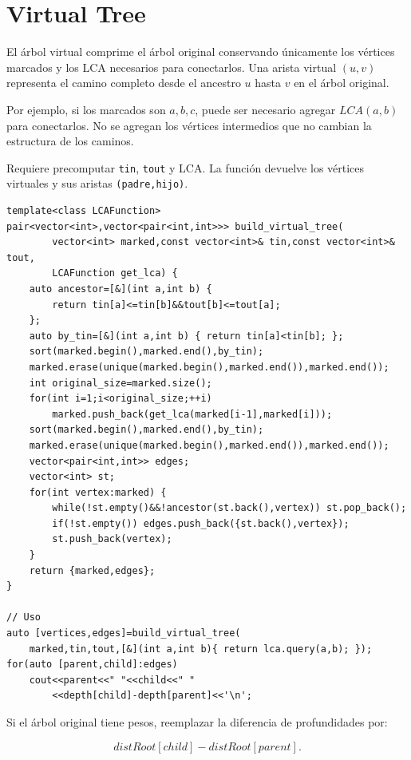\section{Virtual Tree}

El árbol virtual comprime el árbol original conservando únicamente los
vértices marcados y los LCA necesarios para conectarlos. Una arista virtual
$(u,v)$ representa el camino completo desde el ancestro $u$ hasta $v$ en el
árbol original.

Por ejemplo, si los marcados son $a,b,c$, puede ser necesario agregar
$LCA(a,b)$ para conectarlos. No se agregan los vértices intermedios que no
cambian la estructura de los caminos.

Requiere precomputar \texttt{tin}, \texttt{tout} y LCA. La función devuelve
los vértices virtuales y sus aristas \texttt{(padre,hijo)}.


\begin{lstlisting}[style=cpp]
template<class LCAFunction>
pair<vector<int>,vector<pair<int,int>>> build_virtual_tree(
        vector<int> marked,const vector<int>& tin,const vector<int>& tout,
        LCAFunction get_lca) {
    auto ancestor=[&](int a,int b) {
        return tin[a]<=tin[b]&&tout[b]<=tout[a];
    };
    auto by_tin=[&](int a,int b) { return tin[a]<tin[b]; };
    sort(marked.begin(),marked.end(),by_tin);
    marked.erase(unique(marked.begin(),marked.end()),marked.end());
    int original_size=marked.size();
    for(int i=1;i<original_size;++i)
        marked.push_back(get_lca(marked[i-1],marked[i]));
    sort(marked.begin(),marked.end(),by_tin);
    marked.erase(unique(marked.begin(),marked.end()),marked.end());
    vector<pair<int,int>> edges;
    vector<int> st;
    for(int vertex:marked) {
        while(!st.empty()&&!ancestor(st.back(),vertex)) st.pop_back();
        if(!st.empty()) edges.push_back({st.back(),vertex});
        st.push_back(vertex);
    }
    return {marked,edges};
}

// Uso
auto [vertices,edges]=build_virtual_tree(
    marked,tin,tout,[&](int a,int b){ return lca.query(a,b); });
for(auto [parent,child]:edges)
    cout<<parent<<" "<<child<<" "
        <<depth[child]-depth[parent]<<'\n';
\end{lstlisting}

Si el árbol original tiene pesos, reemplazar la diferencia de profundidades por:

\[
    distRoot[child]-distRoot[parent].
\]

